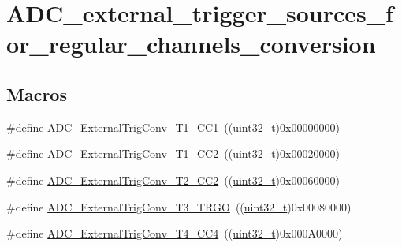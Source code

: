 \hypertarget{group___a_d_c__external__trigger__sources__for__regular__channels__conversion}{}\section{A\+D\+C\+\_\+external\+\_\+trigger\+\_\+sources\+\_\+for\+\_\+regular\+\_\+channels\+\_\+conversion}
\label{group___a_d_c__external__trigger__sources__for__regular__channels__conversion}
\subsection*{Macros}
\begin{DoxyCompactItemize}
\item 
\#define \hyperlink{group___a_d_c__external__trigger__sources__for__regular__channels__conversion_ga303f24361ea930f8214e9e68b63b244e}{A\+D\+C\+\_\+\+External\+Trig\+Conv\+\_\+\+T1\+\_\+\+C\+C1}~((\hyperlink{_p_e___types_8h_a33594304e786b158f3fb30289278f5af}{uint32\+\_\+t})0x00000000)
\item 
\#define \hyperlink{group___a_d_c__external__trigger__sources__for__regular__channels__conversion_ga8bf9fd9ad4e4c12ef41520ded2c3c332}{A\+D\+C\+\_\+\+External\+Trig\+Conv\+\_\+\+T1\+\_\+\+C\+C2}~((\hyperlink{_p_e___types_8h_a33594304e786b158f3fb30289278f5af}{uint32\+\_\+t})0x00020000)
\item 
\#define \hyperlink{group___a_d_c__external__trigger__sources__for__regular__channels__conversion_gadfeb40c1735b0ee50f8a5aafdd840cc6}{A\+D\+C\+\_\+\+External\+Trig\+Conv\+\_\+\+T2\+\_\+\+C\+C2}~((\hyperlink{_p_e___types_8h_a33594304e786b158f3fb30289278f5af}{uint32\+\_\+t})0x00060000)
\item 
\#define \hyperlink{group___a_d_c__external__trigger__sources__for__regular__channels__conversion_ga1cf4549534a00fe2f5527ad783204098}{A\+D\+C\+\_\+\+External\+Trig\+Conv\+\_\+\+T3\+\_\+\+T\+R\+GO}~((\hyperlink{_p_e___types_8h_a33594304e786b158f3fb30289278f5af}{uint32\+\_\+t})0x00080000)
\item 
\#define \hyperlink{group___a_d_c__external__trigger__sources__for__regular__channels__conversion_ga8f6a764b7de878c2e09bbb0d1061d69c}{A\+D\+C\+\_\+\+External\+Trig\+Conv\+\_\+\+T4\+\_\+\+C\+C4}~((\hyperlink{_p_e___types_8h_a33594304e786b158f3fb30289278f5af}{uint32\+\_\+t})0x000\+A0000)
\item 

\end{DoxyCompactItemize}
